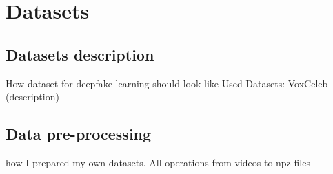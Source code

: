 \chapter{Datasets}
\section{Datasets description}
How dataset for deepfake learning should look like
Used Datasets: VoxCeleb (description)

\section{Data pre-processing}
 how I prepared my own datasets. All operations from videos to npz files